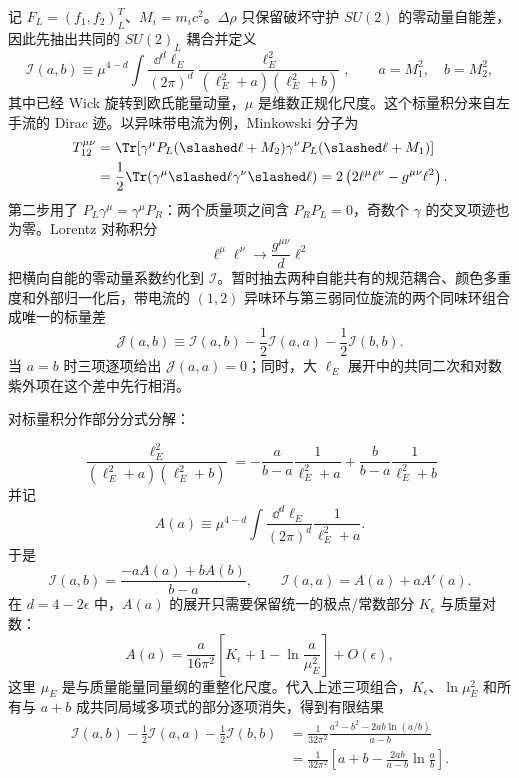 \begin{derivation}
记 $F_L=(f_1,f_2)_L^T$、$M_i=m_ic^2$。$\Delta\rho$ 只保留破坏守护 $SU(2)$ 的零动量自能差，因此先抽出共同的 $SU(2)_L$ 耦合并定义
\begin{equation*}
\mathcal I(a,b)
\equiv\mu^{4-d}\!\int\frac{\dd^d\ell_E}{(2\pi)^d}
\frac{\ell_E^2}{(\ell_E^2+a)(\ell_E^2+b)},
\qquad a=M_1^2,\quad b=M_2^2,
\end{equation*}
其中已经 Wick 旋转到欧氏能量动量，$\mu$ 是维数正规化尺度。这个标量积分来自左手流的 Dirac 迹。以异味带电流为例，Minkowski 分子为
\begin{align*}
T^{\mu\nu}_{12}
&=\Tr\!\left[\gamma^\mu P_L(\slashed\ell+M_2)
\gamma^\nu P_L(\slashed\ell+M_1)\right]\\
&=\frac12\Tr(\gamma^\mu\slashed\ell\gamma^\nu\slashed\ell)
=2\left(2\ell^\mu\ell^\nu-g^{\mu\nu}\ell^2\right).
\end{align*}
第二步用了 $P_L\gamma^\mu=\gamma^\mu P_R$：两个质量项之间含 $P_RP_L=0$，奇数个 $\gamma$ 的交叉项迹也为零。Lorentz 对称积分
\begin{equation*}
\ell^\mu\ell^\nu\longrightarrow\frac{g^{\mu\nu}}{d}\ell^2
\end{equation*}
把横向自能的零动量系数约化到 $\mathcal I$。暂时抽去两种自能共有的规范耦合、颜色多重度和外部归一化后，带电流的 $(1,2)$ 异味环与第三弱同位旋流的两个同味环组合成唯一的标量差
\begin{equation*}
\mathcal J(a,b)
\equiv
\mathcal I(a,b)-\frac12\mathcal I(a,a)-\frac12\mathcal I(b,b).
\end{equation*}
当 $a=b$ 时三项逐项给出 $\mathcal J(a,a)=0$；同时，大 $\ell_E$ 展开中的共同二次和对数紫外项在这个差中先行相消。

对标量积分作部分分式分解：

\begin{equation*}
\frac{\ell_E^2}{(\ell_E^2+a)(\ell_E^2+b)}
=-\frac{a}{b-a}\frac1{\ell_E^2+a}
+\frac{b}{b-a}\frac1{\ell_E^2+b}
\end{equation*}
并记
\begin{equation*}
A(a)\equiv\mu^{4-d}\int\frac{\dd^d\ell_E}{(2\pi)^d}\frac1{\ell_E^2+a}.
\end{equation*}
于是
\begin{equation*}
\mathcal I(a,b)=\frac{-aA(a)+bA(b)}{b-a},
\qquad
\mathcal I(a,a)=A(a)+aA'(a).
\end{equation*}
在 $d=4-2\epsilon$ 中，$A(a)$ 的展开只需要保留统一的极点/常数部分 $K_\epsilon$ 与质量对数：
\begin{equation*}
A(a)=\frac{a}{16\pi^2}
\left[K_\epsilon+1-\ln\frac{a}{\mu_E^2}\right]+O(\epsilon),
\end{equation*}
这里 $\mu_E$ 是与质量能量同量纲的重整化尺度。代入上述三项组合，$K_\epsilon$、$\ln\mu_E^2$ 和所有与 $a+b$ 成共同局域多项式的部分逐项消失，得到有限结果
\begin{align*}
\mathcal I(a,b)-\frac12\mathcal I(a,a)-\frac12\mathcal I(b,b)
&=\frac{1}{32\pi^2}
\frac{a^2-b^2-2ab\ln(a/b)}{a-b}\\
&=\frac{1}{32\pi^2}
\left[a+b-\frac{2ab}{a-b}\ln\frac ab\right].
\end{align*}


\end{derivation}
